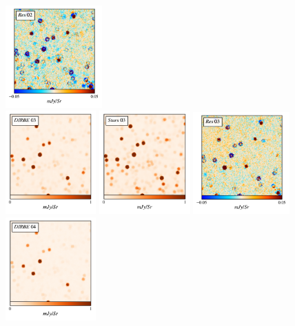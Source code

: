 \documentclass{aa}
\begin{document}
\begin{figure}
  \includegraphics[width=0.33\textwidth]{figs/zoom/resmap_02.pdf}\\
    \includegraphics[width=0.31\textwidth]{figs/zoom/bandmap_03.pdf}
  \includegraphics[width=0.31\textwidth]{figs/zoom/starmap_03.pdf}
  \includegraphics[width=0.33\textwidth]{figs/zoom/resmap_03.pdf}\\
    \includegraphics[width=0.31\textwidth]{figs/zoom/bandmap_04.pdf}

\end{figure}
\end{document}
